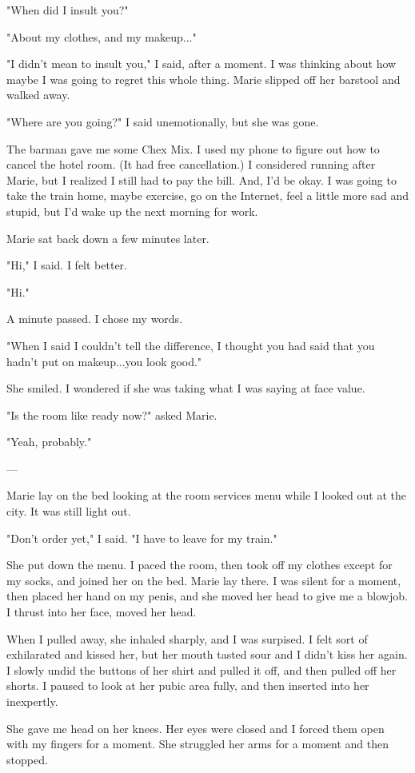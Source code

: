 \documentclass[12pt]{article}
\begin{document}
"When did I insult you?"

"About my clothes, and my makeup..."

"I didn't mean to insult you," I said, after a moment.  I was thinking about how
maybe I was going to regret this whole thing.  Marie slipped off her barstool
and walked away.

"Where are you going?" I said unemotionally, but she was gone. 

The barman gave me some Chex Mix.  I used my phone to figure out how to cancel
the hotel room.  (It had free cancellation.)  I considered running after Marie,
but I realized I still had to pay the bill.  And, I'd be okay.  I was going to
take the train home, maybe exercise, go on the Internet, feel a little more sad
and stupid, but I'd wake up the next morning for work.

Marie sat back down a few minutes later.

"Hi," I said.  I felt better.

"Hi."

A minute passed.  I chose my words.

"When I said I couldn't tell the difference, I thought you had said that you
hadn't put on makeup...you look good."

She smiled.  I wondered if she was taking what I was saying at face value.

"Is the room like ready now?" asked Marie.

"Yeah, probably."

---

Marie lay on the bed looking at the room services menu while I looked out at the
city.  It was still light out.  

"Don't order yet," I said.  "I have to leave for my train."

She put down the menu.  I paced the room, then took off my clothes except for my
socks, and joined her on the bed.  Marie lay there.  I was silent for a moment,
then placed her hand on my penis, and she moved her head to give me a blowjob.
I thrust into her face, moved her head.

When I pulled away, she inhaled sharply, and I was surpised.  I felt sort of
exhilarated and kissed her, but her mouth tasted sour and I didn't kiss her
again.  I slowly undid the buttons of her shirt and pulled it off, and then
pulled off her shorts.  I paused to look at her pubic area fully, and then
inserted into her inexpertly.  

She gave me head on her knees.  Her eyes were closed and I forced them open with
my fingers for a moment.  She struggled her arms for a moment and then stopped.  
\end{document}
